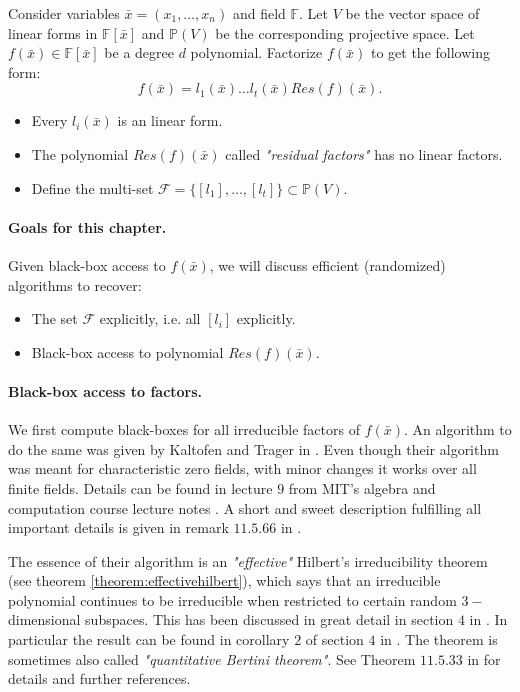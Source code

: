 \documentclass[12pt]{caltech_thesis}
\theoremstyle{plain}
\theoremstyle{definition}
\newcommand{\F}{\mathbb{F}}
\newcommand{\MF}{\mathcal{F}}
\newcommand{\PP}{\mathbb{P}}
\newcommand{\B}[1]{\bar{#1}}
\begin{document}
Consider variables $\B{x} = (x_1,\ldots,x_n)$ and field $\F$. Let $V$ be the vector space of linear forms in $\F[\B{x}]$ and
$\PP(V)$ be the corresponding projective space. Let $f(\B{x}) \in \F[\B{x}]$ be a degree $d$ polynomial.
 Factorize $f(\B{x})$ to get the following form:
 \begin{equation}\label{polytype}
  f(\B{x}) = l_1(\B{x})\ldots l_t(\B{x})Res(f)(\B{x}).
 \end{equation}
\begin{itemize}
\renewcommand\labelitemi{--}

 \item Every $l_i(\B{x})$ is an linear form.
 \item The polynomial $Res(f)(\B{x})$ called \emph{"residual factors"} has no linear factors.
 \item Define the multi-set $\MF = \{[l_1],\ldots ,[l_t]\}\subset \PP(V)$.
\end{itemize}

\paragraph{Goals for this chapter. }
Given black-box access to $f(\B{x})$, we will discuss efficient (randomized) algorithms to recover:
\begin{itemize}
\renewcommand\labelitemi{--}
 \item The set $\MF$ explicitly, i.e. all $[l_i]$ explicitly.
 \item Black-box access to polynomial $Res(f)(\B{x})$.
\end{itemize}


\paragraph{Black-box access to factors. }
We first compute black-boxes for all irreducible factors of $f(\B{x})$. An algorithm to do the same was given by Kaltofen and Trager in \cite{KalTr90}.
Even though
their algorithm was meant for characteristic zero fields, with minor changes it works over all finite fields. Details can be found in lecture $9$
from MIT's algebra and computation course lecture notes \cite{Sud98}. A short and sweet description fulfilling all important details is given in remark $11.5.66$ in 
\cite{MulPa13}.

The essence of their algorithm is an \emph{"effective"} Hilbert's irreducibility theorem (see theorem \ref{theorem:effectivehilbert}), which says that an irreducible polynomial continues to
be irreducible when restricted to certain random $3-$ dimensional subspaces. This has been discussed in great detail in section $4$ in \cite{Kal91}.
In particular the result can be found in corollary $2$ of section $4$ in \cite{Kal91}. 
The theorem is sometimes also called \emph{"quantitative Bertini theorem"}.
See Theorem $11.5.33$ in \cite{MulPa13} for details and further references.
\end{document}
